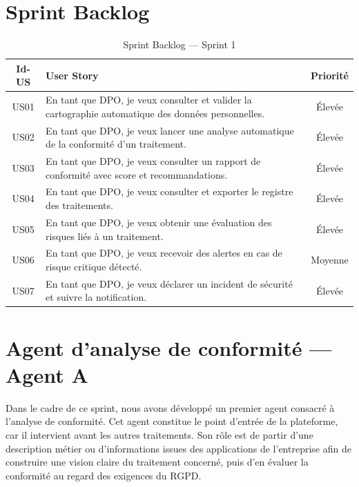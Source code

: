 \documentclass[12pt,a4paper]{report}
\begin{document}
\section{Sprint Backlog}

\begin{table}[H]
\centering
\caption{Sprint Backlog --- Sprint 1}
\label{tab:backlog_sprint1}
\begin{tabularx}{\textwidth}{|c|X|c|}
\hline
\textbf{Id-US} & \textbf{User Story} & \textbf{Priorité} \\
\hline
US01 & En tant que DPO, je veux consulter et valider la cartographie automatique des données personnelles. & Élevée \\
\hline
US02 & En tant que DPO, je veux lancer une analyse automatique de la conformité d'un traitement. & Élevée \\
\hline
US03 & En tant que DPO, je veux consulter un rapport de conformité avec score et recommandations. & Élevée \\
\hline
US04 & En tant que DPO, je veux consulter et exporter le registre des traitements. & Élevée \\
\hline
US05 & En tant que DPO, je veux obtenir une évaluation des risques liés à un traitement. & Élevée \\
\hline
US06 & En tant que DPO, je veux recevoir des alertes en cas de risque critique détecté. & Moyenne \\
\hline
US07 & En tant que DPO, je veux déclarer un incident de sécurité et suivre la notification. & Élevée \\
\hline
\end{tabularx}
\end{table}

\section{Agent d'analyse de conformité --- Agent A}

Dans le cadre de ce sprint, nous avons développé un premier agent consacré à l'analyse de conformité. Cet agent constitue le point d'entrée de la plateforme, car il intervient avant les autres traitements. Son rôle est de partir d'une description métier ou d'informations issues des applications de l'entreprise afin de construire une vision claire du traitement concerné, puis d'en évaluer la conformité au regard des exigences du RGPD.
\end{document}

